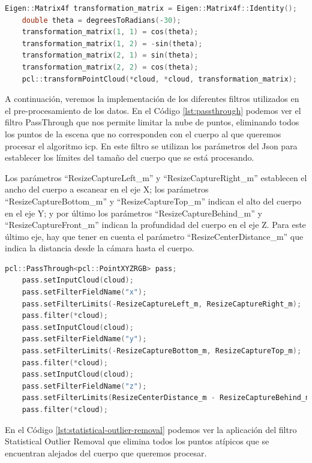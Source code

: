 \begin{lstlisting}[language={C++}, caption={Rotación en fase de pre-procesamiento de la nube de puntos}, label={lst:rotacion-preprocesamiento}]
    Eigen::Matrix4f transformation_matrix = Eigen::Matrix4f::Identity();
    double theta = degreesToRadians(-30);
    transformation_matrix(1, 1) = cos(theta);
    transformation_matrix(1, 2) = -sin(theta);
    transformation_matrix(2, 1) = sin(theta);
    transformation_matrix(2, 2) = cos(theta);
    pcl::transformPointCloud(*cloud, *cloud, transformation_matrix);
\end{lstlisting}

A continuación, veremos la implementación de los diferentes filtros utilizados en el pre-procesamiento de los datos. En el Código \ref{lst:passthrough} podemos ver el filtro PassThrough que nos permite limitar la nube de puntos, eliminando todos los puntos de la escena que no corresponden con el cuerpo al que queremos procesar el algoritmo \gls{icp}.
En este filtro se utilizan los parámetros del Json para establecer los límites del tamaño del cuerpo que se está procesando.

Los parámetros ``ResizeCaptureLeft\_m'' y ``ResizeCaptureRight\_m'' establecen el ancho del cuerpo a escanear en el eje X; los parámetros ``ResizeCaptureBottom\_m'' y ``ResizeCaptureTop\_m'' indican el alto del cuerpo en el eje Y; y por último los parámetros ``ResizeCaptureBehind\_m'' y ``ResizeCaptureFront\_m'' indican la profundidad del cuerpo en el eje Z. Para este último eje, hay que tener en cuenta el parámetro ``ResizeCenterDistance\_m'' que indica la distancia desde la cámara hasta el cuerpo.

\begin{lstlisting}[language={C++}, caption={Aplicación del Filtro PassThrough}, label={lst:passthrough}]
    pcl::PassThrough<pcl::PointXYZRGB> pass;
    pass.setInputCloud(cloud);
    pass.setFilterFieldName("x");
    pass.setFilterLimits(-ResizeCaptureLeft_m, ResizeCaptureRight_m);
    pass.filter(*cloud);
    pass.setInputCloud(cloud);
    pass.setFilterFieldName("y");
    pass.setFilterLimits(-ResizeCaptureBottom_m, ResizeCaptureTop_m);
    pass.filter(*cloud);
    pass.setInputCloud(cloud);
    pass.setFilterFieldName("z");
    pass.setFilterLimits(ResizeCenterDistance_m - ResizeCaptureBehind_m, ResizeCenterDistance_m + ResizeCaptureFront_m);
    pass.filter(*cloud);
\end{lstlisting}

En el Código \ref{lst:statistical-outlier-removal} podemos ver la aplicación del filtro Statistical Outlier Removal que elimina todos los puntos atípicos que se encuentran alejados del cuerpo que queremos procesar.

